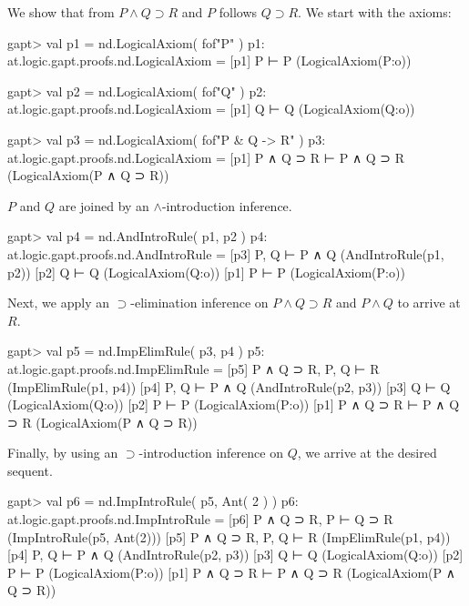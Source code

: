 \documentclass[a4paper,11pt]{book}
\newcommand{\impl}{\supset} %
\renewcommand{\land}{\wedge}
\begin{document}
We show that from $P \land Q \impl R$ and $P$ follows $Q \impl R$. We start with
the axioms:

\begin{clilisting}
gapt> val p1 = nd.LogicalAxiom( fof"P" )
p1: at.logic.gapt.proofs.nd.LogicalAxiom =
[p1] P ⊢ P    (LogicalAxiom(P:o))

gapt> val p2 = nd.LogicalAxiom( fof"Q" )
p2: at.logic.gapt.proofs.nd.LogicalAxiom =
[p1] Q ⊢ Q    (LogicalAxiom(Q:o))

gapt> val p3 = nd.LogicalAxiom( fof"P & Q -> R" )
p3: at.logic.gapt.proofs.nd.LogicalAxiom =
[p1] P ∧ Q ⊃ R ⊢ P ∧ Q ⊃ R    (LogicalAxiom(P ∧ Q ⊃ R))

\end{clilisting}

$P$ and $Q$ are joined by an $\land$-introduction inference.

\begin{clilisting}
gapt> val p4 = nd.AndIntroRule( p1, p2 )
p4: at.logic.gapt.proofs.nd.AndIntroRule =
[p3] P, Q ⊢ P ∧ Q    (AndIntroRule(p1, p2))
[p2] Q ⊢ Q    (LogicalAxiom(Q:o))
[p1] P ⊢ P    (LogicalAxiom(P:o))

\end{clilisting}

Next, we apply an $\impl$-elimination inference on $P \land Q \impl R$
and $P \land Q$ to arrive at $R$.

\begin{clilisting}
gapt> val p5 = nd.ImpElimRule( p3, p4 )
p5: at.logic.gapt.proofs.nd.ImpElimRule =
[p5] P ∧ Q ⊃ R, P, Q ⊢ R    (ImpElimRule(p1, p4))
[p4] P, Q ⊢ P ∧ Q    (AndIntroRule(p2, p3))
[p3] Q ⊢ Q    (LogicalAxiom(Q:o))
[p2] P ⊢ P    (LogicalAxiom(P:o))
[p1] P ∧ Q ⊃ R ⊢ P ∧ Q ⊃ R    (LogicalAxiom(P ∧ Q ⊃ R))

\end{clilisting}

Finally, by using an $\impl$-introduction inference on $Q$, we arrive
at the desired sequent.

\begin{clilisting}
gapt> val p6 = nd.ImpIntroRule( p5, Ant( 2 ) )
p6: at.logic.gapt.proofs.nd.ImpIntroRule =
[p6] P ∧ Q ⊃ R, P ⊢ Q ⊃ R    (ImpIntroRule(p5, Ant(2)))
[p5] P ∧ Q ⊃ R, P, Q ⊢ R    (ImpElimRule(p1, p4))
[p4] P, Q ⊢ P ∧ Q    (AndIntroRule(p2, p3))
[p3] Q ⊢ Q    (LogicalAxiom(Q:o))
[p2] P ⊢ P    (LogicalAxiom(P:o))
[p1] P ∧ Q ⊃ R ⊢ P ∧ Q ⊃ R    (LogicalAxiom(P ∧ Q ⊃ R))

\end{clilisting}
\end{document}
